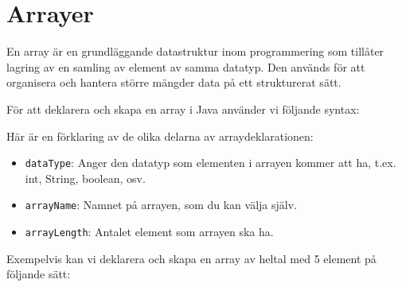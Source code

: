 \hypertarget{cb4}{}
\begin{Shaded}
\begin{Highlighting}[]
  \OperatorTok{[]} \OperatorTok{(}\OperatorTok{[]}\OperatorTok{)} \OperatorTok{\{}
     \OperatorTok{(}\OperatorTok{)}
        \OperatorTok{()}
        \OperatorTok{(}\OperatorTok{[]::}\OperatorTok{);}
\OperatorTok{\}}
\end{Highlighting}
\end{Shaded}

\hypertarget{arrayer}{%
\section{Arrayer}\label{arrayer}}

En array är en grundläggande datastruktur inom programmering som
tillåter lagring av en samling av element av samma datatyp. Den används
för att organisera och hantera större mängder data på ett strukturerat
sätt.

För att deklarera och skapa en array i Java använder vi följande syntax:

\hypertarget{cb1}{}
\begin{Shaded}
\begin{Highlighting}[]
\OperatorTok{[]}\OperatorTok{=} \OperatorTok{[}\OperatorTok{];}
\end{Highlighting}
\end{Shaded}

Här är en förklaring av de olika delarna av arraydeklarationen:

\begin{itemize}
\tightlist
\item
  \texttt{dataType}: Anger den datatyp som elementen i arrayen kommer
  att ha, t.ex. int, String, boolean, osv.
\item
  \texttt{arrayName}: Namnet på arrayen, som du kan välja själv.
\item
  \texttt{arrayLength}: Antalet element som arrayen ska ha.
\end{itemize}

Exempelvis kan vi deklarera och skapa en array av heltal med 5 element
på följande sätt:

